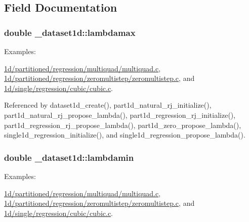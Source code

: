 \subsection{Field Documentation}
\subsubsection[{\texorpdfstring{lambdamax}{lambdamax}}]{\setlength{\rightskip}{0pt plus 5cm}double \+\_\+dataset1d\+::lambdamax}\hypertarget{struct__dataset1d_ac07faf1146371645b1cb77495f866f48}{}\label{struct__dataset1d_ac07faf1146371645b1cb77495f866f48}
\begin{Desc}
\item[Examples\+: ]\par
\hyperlink{1d_2partitioned_2regression_2multiquad_2multiquad_8c-example}{1d/partitioned/regression/multiquad/multiquad.\+c}, \hyperlink{1d_2partitioned_2regression_2zeromultistep_2zeromultistep_8c-example}{1d/partitioned/regression/zeromultistep/zeromultistep.\+c}, and \hyperlink{1d_2single_2regression_2cubic_2cubic_8c-example}{1d/single/regression/cubic/cubic.\+c}.\end{Desc}


Referenced by dataset1d\+\_\+create(), part1d\+\_\+natural\+\_\+rj\+\_\+initialize(), part1d\+\_\+natural\+\_\+rj\+\_\+propose\+\_\+lambda(), part1d\+\_\+regression\+\_\+rj\+\_\+initialize(), part1d\+\_\+regression\+\_\+rj\+\_\+propose\+\_\+lambda(), part1d\+\_\+zero\+\_\+propose\+\_\+lambda(), single1d\+\_\+regression\+\_\+initialize(), and single1d\+\_\+regression\+\_\+propose\+\_\+lambda().

\subsubsection[{\texorpdfstring{lambdamin}{lambdamin}}]{\setlength{\rightskip}{0pt plus 5cm}double \+\_\+dataset1d\+::lambdamin}\hypertarget{struct__dataset1d_ad4d2e3a3d2eb35338ce1d819142cefb8}{}\label{struct__dataset1d_ad4d2e3a3d2eb35338ce1d819142cefb8}
\begin{Desc}
\item[Examples\+: ]\par
\hyperlink{1d_2partitioned_2regression_2multiquad_2multiquad_8c-example}{1d/partitioned/regression/multiquad/multiquad.\+c}, \hyperlink{1d_2partitioned_2regression_2zeromultistep_2zeromultistep_8c-example}{1d/partitioned/regression/zeromultistep/zeromultistep.\+c}, and \hyperlink{1d_2single_2regression_2cubic_2cubic_8c-example}{1d/single/regression/cubic/cubic.\+c}.\end{Desc}


